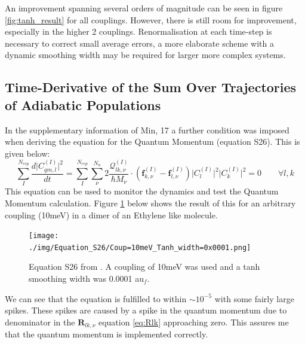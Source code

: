 \noindent An improvement spanning several orders of magnitude can be seen in figure \ref{fig:tanh_result} for all couplings. However, there is still room for improvement, especially in the higher 2 couplings. Renormalisation at each time-step is necessary to correct small average errors, a more elaborate scheme with a dynamic smoothing width may be required for larger more complex systems.
\\
\subsection{Time-Derivative of the Sum Over Trajectories of Adiabatic Populations}
In the supplementary information of Min, 17 \cite{min_ab_2017} a further condition was imposed when deriving the equation for the Quantum Momentum (equation S26). This is given below:
\begin{equation}
  \sum_{I}^{N_{rep}} \frac{d\vert C_{qm, l}^{(I)} \vert^2}{dt} = \sum_{I}^{N_{rep}} \sum_{\nu}^{N_n} 2 \frac{\mathcal{Q}_{lk, \nu}^{(I)}}{\hbar M_{\nu}} \cdot \left( \textbf{f}_{k, \nu}^{(I)} - \textbf{f}_{l, \nu}^{(I)} \right) \vert C_{l}^{(I)}\vert^2 \vert C_{k}^{(I)}\vert^2 = 0 \qquad \forall l, k
  \label{eq:S26}
\end{equation}
This equation can be used to monitor the dynamics and test the Quantum Momentum calculation. Figure \ref{fig:S26_10meV_0.0001auf} below shows the result of this for an arbitrary coupling (10meV) in a dimer of an Ethylene like molecule.
\begin{figure}[H]
  \texttt{[image: ./img/Equation\_S26/Coup=10meV\_Tanh\_width=0x0001.png]}
  \caption{\label{fig:S26_10meV_0.0001auf}Equation S26 from \cite{min_ab_2017}. A coupling of 10meV was used and a tanh smoothing width was 0.0001 au$_f$.}
\end{figure}
\noindent We can see that the equation is fulfilled to within $\sim 10^{-5}$ with some fairly large spikes. These spikes are caused by a spike in the quantum momentum due to denominator in the $\textbf{R}_{lk, \nu}$ equation \eqref{eq:Rlk} approaching zero. This assures me that the quantum momentum is implemented correctly.


\newpage
